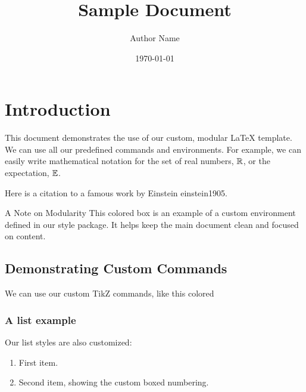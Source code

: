\documentclass{e_class_noteLong}
\title{Sample Document}
\author{Author Name}
\date{\today}
\begin{document}

\maketitle
\mytoc

\chapter{Introduction}

This document demonstrates the use of our custom, modular \LaTeX{} template.
We can use all our predefined commands and environments. For example, we can easily write mathematical notation for the set of real numbers, $\mathbb{R}$, or the expectation, $\mathbb{E}$.

Here is a citation to a famous work by Einstein einstein1905.

\begin{callout}{A Note on Modularity}
    This colored box is an example of a custom environment defined in our style package. It helps keep the main document clean and focused on content.
\end{callout}

\section{Demonstrating Custom Commands}

We can use our custom TikZ commands, like this colored

\subsection{A list example}
Our list styles are also customized:
\begin{enumerate}
    \item First item.
    \item Second item, showing the custom boxed numbering.
\end{enumerate}
\end{document}
